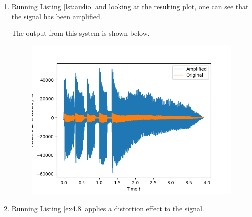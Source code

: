\begin{enumerate}
  \item Running Listing \ref{lst:audio} and looking at the resulting plot, one can see that the signal has been amplified.
        
        The output from this system is shown below.
        \begin{figure}
          \centering
          \includegraphics[scale=0.9]{ch04/figures/ex7_plot.png}
        \end{figure}

  \item Running Listing \ref{ex4.8} applies a distortion effect to the signal.
        

\end{enumerate}
